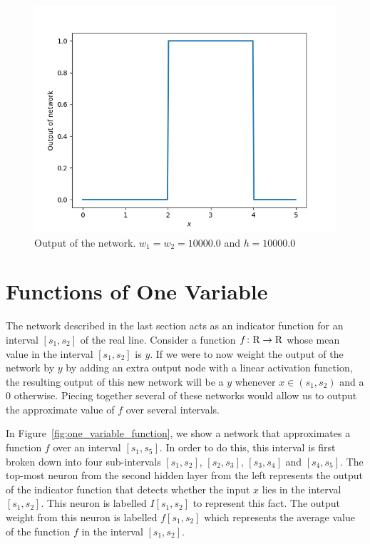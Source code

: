 \begin{figure}[ht]
\begin{center}
\includegraphics[scale=0.5]{xStepFunction.png}
\end{center}
\caption{Output of the network. $w_1 = w_2 = 10000.0$ and $h = 10000.0$}
\label{fig:x_step_function}
\end{figure}



\section{Functions of One Variable}

The network described in the last section acts as an indicator function
for an interval $[s_1, s_2]$ of the real line. Consider a function 
$f \colon \text{R} \to \text{R}$ whose mean value in the interval $[s_1, s_2]$ 
is $y$. If we were to now weight the output of the network by $y$ by 
adding an extra output node with a linear activation function, the resulting 
output of this new network will be a $y$ whenever $x \in (s_1, s_2)$ and a $0$ 
otherwise. Piecing together several of these networks would allow us 
to output the approximate value of $f$ over several intervals. 

In Figure~\ref{fig:one_variable_function}, we show a network that approximates 
a function $f$ over an interval $[s_1, s_5]$. In order to do this, this interval 
is first broken down into four sub-intervals $[s_1, s_2]$, $[s_2, s_3]$, $[s_3, s_4]$
and $[s_4, s_5]$. The top-most neuron from the second hidden layer from the left 
represents the output of the indicator function that detects whether the input $x$ 
lies in the interval $[s_1, s_2]$. This neuron is labelled $I[s_1, s_2]$ to 
represent this fact. The output weight from this neuron is labelled $f[s_1, s_2]$
which represents the average value of the function $f$ in the interval $[s_1, s_2]$.

